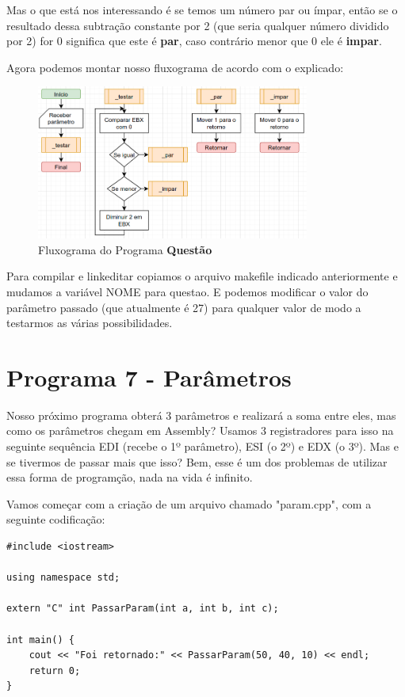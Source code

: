 Mas o que está nos interessando é se temos um número par ou ímpar, então se o resultado dessa subtração constante por 2 (que seria qualquer número dividido por 2) for 0 significa que este é \textbf{par}, caso contrário menor que 0 ele é \textbf{impar}.

Agora podemos montar nosso fluxograma de acordo com o explicado:
\begin{figure}[H]
	\centering
	\includegraphics[width=0.8\textwidth]{Pictures/cap02/programa6}
	\caption{Fluxograma do Programa \textbf{Questão}}
\end{figure}

Para compilar e linkeditar copiamos o arquivo makefile indicado anteriormente e mudamos a variável NOME para questao. E podemos modificar o valor do parâmetro passado (que atualmente é 27) para qualquer valor de modo a testarmos as várias possibilidades.

\section{Programa 7 - Parâmetros}
Nosso próximo programa obterá 3 parâmetros e realizará a soma entre eles, mas como os parâmetros chegam em Assembly? Usamos 3 registradores para isso na seguinte sequência EDI (recebe o 1º parâmetro), ESI (o 2º) e EDX (o 3º). Mas e se tivermos de passar mais que isso? Bem, esse é um dos problemas de utilizar essa forma de programção, nada na vida é infinito.

Vamos começar com a criação de um arquivo chamado "param.cpp", com a seguinte codificação:
\begin{lstlisting}[]
#include <iostream>

using namespace std;

extern "C" int PassarParam(int a, int b, int c);

int main() {
	cout << "Foi retornado:" << PassarParam(50, 40, 10) << endl;
	return 0;
}
\end{lstlisting}

